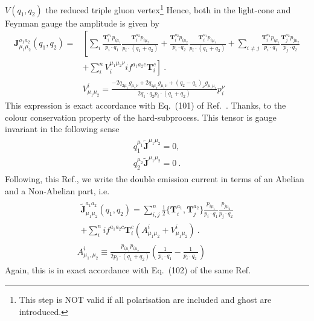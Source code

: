 \documentclass[a4paper,11pt]{article}
\numberwithin{equation}{section}
\newcommand{\bJ}{\mathbf{J}}
\newcommand{\bT}{\mathbf{T}}
\newcommand{\ldot}{\!\cdot\!}
\begin{document}
$V(q_1,q_2) $ the reduced triple gluon vertex\footnote{This step is NOT valid if all polarisation are included and ghost are introduced.}
Hence, both in the light-cone and Feynman gauge the amplitude is given by 
\begin{align*}
%
 \bJ_{\mu_1\mu_2}^{a_1a_2} (q_1,q_2)=
& \left[ \sum_{i}
\frac{\bT_i^{a_1} p_{i\mu_1}}{p_i \ldot q_1}  
\frac{\bT_i^{a_2} p_{i \mu_2}}{p_i \ldot (q_1+q_2)} +
\frac{\bT_i^{a_2} p_{i\mu_2}}{p_i \ldot q_2}  
\frac{\bT_i^{a_1} p_{i \mu_1}}{p_i \ldot (q_1+q_2)} 
+
\sum_{i\ne j}\frac{\bT_i^{a_1} p_{i\mu_1}}{p_i \ldot q_1}  
\frac{\bT_j^{a_2} p_{j \mu_2}}{p_j \ldot q_2}\right.
%
\\&
\left.+  \sum_{i}^n  V_i^{\mu_1\mu_2\nu}  if^{a_1a_2c} \bT_i^{c}   \right] ~.\\
& V^i_{\mu_1\mu_2} = 
\frac{-2q_{2\mu_1}g_{\mu_2\nu}+2q_{1\mu_2}g_{\mu_1\nu}+(q_2-q_1)_\nu g_{\mu_1\mu_2}}{2q_1\ldot q_2 p_i\ldot(q_1+q_2)} p_i^{\nu}
\end{align*}
This expression is exact accordance with Eq.~(101) of  Ref.~\cite{Catani:1999ss}. Thanks, to the colour conservation property of the hard-subprocess. This tensor is gauge invariant in the following sense
\begin{align}
\begin{gathered}
 q_{1}^{\mu_1} \widetilde{\bJ}  ^{\mu_1\mu_2}=0,\\
  q_{2}^{\mu_2} \widetilde{\bJ}  ^{\mu_1\mu_2}=0~. 
\end{gathered}\label{eq:currentGI}
\end{align}
Following, this Ref., we write 
the double emission current in terms of an Abelian and a Non-Abelian part, i.e. 
\begin{align}
\begin{gathered}
\begin{gathered}
%
 \widetilde{\bJ}_{\mu_1\mu_2}^{a_1a_2} (q_1,q_2)   =
\sum_{i, j}^n\frac{1}{2}  \{ \bT_i^{a_1} ,  \bT_j^{a_2}\}\frac{ p_{i\mu_1}}{p_i \ldot q_1}  
\frac{ p_{j \mu_2}}{p_j \ldot q_2}
%
\\
+  \sum_{i}^n  if^{a_1a_2c} \bT_i^{c}
 \left( A^i_{\mu_1\mu_2}
+V^i_{\mu_1\mu_2} \right)   ~.
\end{gathered}\label{eq:usedtensor}\\
A^i_{\mu_1,\mu_2}\equiv \frac{p_{i\mu_1}p_{i\mu_2}}{2p_i \ldot (q_1+q_2)} \left(\frac{1}{p_i\ldot q_1}-\frac{1}{p_i\ldot q_2\, }\right)
\end{gathered}
\end{align}
Again, this is in exact accordance with Eq.~(102) of the same Ref. 
\end{document}
